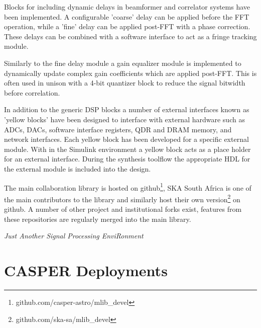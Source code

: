 \documentclass{ws-jai}
\begin{document}
Blocks for including dynamic delays in beamformer and correlator systems have
been implemented. A configurable 'coarse' delay can be applied before the FFT
operation, while a 'fine' delay can be applied post-FFT with a phase correction.
These delays can be combined with a software interface to act as a fringe
tracking module.

Similarly to the fine delay module a gain equalizer module is implemented to
dynamically update complex gain coefficients which are applied post-FFT. This is
often used in unison with a 4-bit quantizer block to reduce the signal bitwidth
before correlation.

In addition to the generic DSP blocks a number of external interfaces known as
'yellow blocks' have been designed to interface with external hardware such as
ADCs, DACs, software interface registers, QDR  and DRAM memory, and network
interfaces. Each yellow block has been developed for a specific external module.
With in the Simulink environment a yellow block acts as a place holder for an
external interface. During the synthesis toolflow the appropriate HDL for the
external module is included into the design.

The main collaboration library is hosted on
github\footnote{github.com/casper-astro/mlib\_devel}, SKA South Africa
is one of the main contributors to the library and similarly host their own
version\footnote{github.com/ska-sa/mlib\_devel} on github. A number of
other project and institutional forks exist, features from these repositories
are regularly merged into the main library.

\emph{Just Another Signal Processing EnviRonment}


\section{CASPER Deployments} \label{sec:Deployments}
\end{document}
